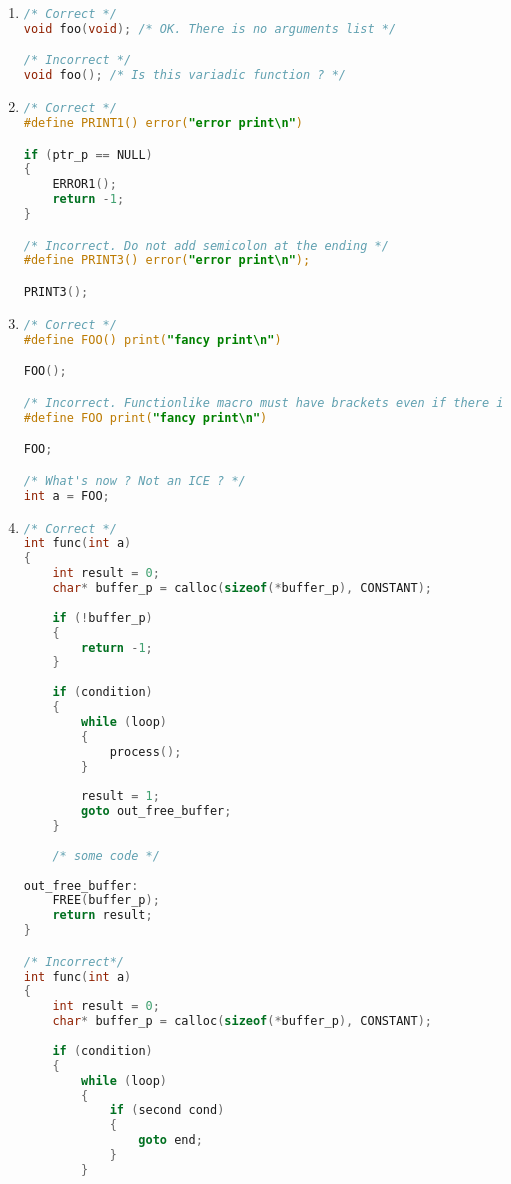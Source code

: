 \begin{enumerate}
    \item 
\begin{lstlisting}[language=C,style=C99]
/* Correct */
void foo(void); /* OK. There is no arguments list */

/* Incorrect */
void foo(); /* Is this variadic function ? */
\end{lstlisting}    
    
    \item
\begin{lstlisting}[language=C,style=C99]
/* Correct */
#define PRINT1() error("error print\n")

if (ptr_p == NULL)
{
    ERROR1();
    return -1;
}

/* Incorrect. Do not add semicolon at the ending */
#define PRINT3() error("error print\n"); 

PRINT3();
\end{lstlisting}

    \item
\begin{lstlisting}[language=C,style=C99]
/* Correct */
#define FOO() print("fancy print\n")

FOO();

/* Incorrect. Functionlike macro must have brackets even if there is no arguments at input */
#define FOO print("fancy print\n")

FOO;

/* What's now ? Not an ICE ? */
int a = FOO;
\end{lstlisting}

    \item
\begin{lstlisting}[language=C,style=C99]
/* Correct */
int func(int a)
{
    int result = 0;
    char* buffer_p = calloc(sizeof(*buffer_p), CONSTANT);
    
    if (!buffer_p)
    {
        return -1;
    }
    
    if (condition)
    {
        while (loop)
        {
            process();
        }
        
        result = 1;
        goto out_free_buffer;
    }
    
    /* some code */
    
out_free_buffer:
    FREE(buffer_p);
    return result;
}

/* Incorrect*/
int func(int a)
{
    int result = 0;
    char* buffer_p = calloc(sizeof(*buffer_p), CONSTANT);
    
    if (condition)
    {
        while (loop)
        {
            if (second cond)
            {
                goto end;
            }
        }
        

\end{lstlisting}
\end{enumerate}
